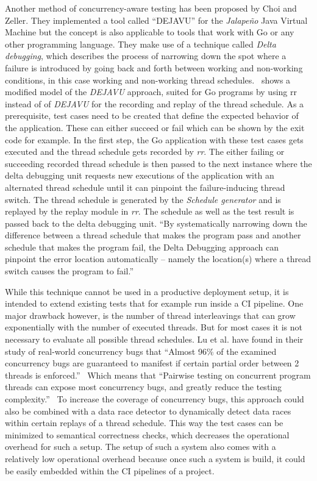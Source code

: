\documentclass[conference]{IEEEtran}
\begin{document}
Another method of concurrency-aware testing has been proposed by Choi and Zeller.\cite{acm2002}
They implemented a tool called ``DEJAVU'' for the \emph{Jalapeño} Java Virtual Machine but the concept is also applicable to tools that work with Go or any other programming language.
They make use of a technique called \emph{Delta debugging}, which describes the process of narrowing down the spot where a failure is introduced by going back and forth between working and non-working conditions, in this case working and non-working thread schedules.~\cite{zeller2002delta}
 shows a modified model of the \emph{DEJAVU} approach, suited for Go programs by using rr instead of of \emph{DEJAVU} for the recording and replay of the thread schedule.
As a prerequisite, test cases need to be created that define the expected behavior of the application.
These can either succeed or fail which can be shown by the exit code for example.
In the first step, the Go application with these test cases gets executed and the thread schedule gets recorded by \emph{rr}.
The either failing or succeeding recorded thread schedule is then passed to the next instance where the delta debugging unit requests new executions of the application with an alternated thread schedule until it can pinpoint the failure-inducing thread switch.
The thread schedule is generated by the \emph{Schedule generator} and is replayed by the replay module in \emph{rr}.
The schedule as well as the test result is passed back to the delta debugging unit.
``By systematically narrowing down the difference between a thread schedule that makes the program pass and another schedule that makes the program fail, the Delta Debugging approach can pinpoint the error location automatically -- namely the location(s) where a thread switch causes the program to fail.''~\cite{acm2002}

While this technique cannot be used in a productive deployment setup, it is intended to extend existing tests that for example run inside a CI pipeline.
One major drawback however, is the number of thread interleavings that can grow exponentially with the number of executed threads.
But for most cases it is not necessary to evaluate all possible thread schedules.
Lu et al. have found in their study of real-world concurrency bugs that ``Almost 96\% of the examined concurrency bugs are guaranteed to manifest if certain partial order between 2 threads is enforced.''~\cite{lu2008mistakes}
Which means that ``Pairwise testing on concurrent program threads can expose most concurrency bugs, and greatly reduce the testing complexity.''~\cite{lu2008mistakes}
To increase the coverage of concurrency bugs, this approach could also be combined with a data race detector to dynamically detect data races within certain replays of a thread schedule.
This way the test cases can be minimized to semantical correctness checks, which decreases the operational overhead for such a setup.
The setup of such a system also comes with a relatively low operational overhead because once such a system is build, it could be easily embedded within the CI pipelines of a project.
\end{document}
